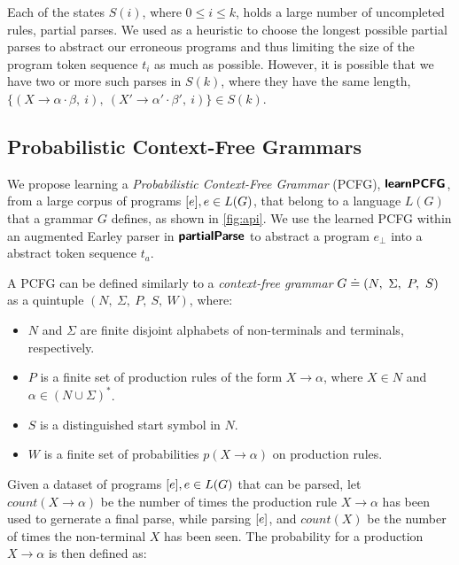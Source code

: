 Each of the states $S(i)$, where $0
\leq i \leq k$, holds a large number of uncompleted rules, \ie partial parses.
We used as a heuristic to choose the longest possible partial parses to abstract
our erroneous programs and thus limiting the size of the program token sequence
$t_i$ as much as possible. However, it is possible that we have two or more such
parses in $S(k)$, where they have the same length, \eg $\{(X \rightarrow \alpha
\cdot \beta,\ i),\ (X' \rightarrow \alpha' \cdot \beta',\ i)\} \in S(k)$.




\subsection{Probabilistic Context-Free Grammars}
\label{sec:prog-abstract:pcfg}
We propose learning a \emph{Probabilistic Context-Free Grammar} (PCFG),
$\bm{\mathsf{learnPCFG}}$, from a large corpus of programs $[e], e \in L(G)$, that
belong to a language $L(G)$ that a grammar $G$ defines, as shown in
\autoref{fig:api}. We use the learned PCFG within an augmented Earley parser in
$\bm{\mathsf{partialParse}}$ to abstract a program $e_{\bot}$ into a abstract token sequence
$t_a$.

A PCFG can be defined similarly to a \emph{context-free grammar} $G \doteq (N,\
\Sigma,\ P,\ S)$ as a quintuple $(N,\ \Sigma,\ P,\ S,\ W)$, where:
\begin{itemize}
    \item $N$ and $\Sigma$ are finite disjoint alphabets of non-terminals and
    terminals, respectively.
    \item $P$ is a finite set of production rules of the form $X \rightarrow
    \alpha$, where $X \in N$ and $\alpha \in (N \cup \Sigma)^{\ast}$.
    \item $S$ is a distinguished start symbol in $N$.
    \item $W$ is a finite set of probabilities $p(X \rightarrow \alpha)$ on
    production rules.
\end{itemize}

Given a dataset of programs $[e], e \in L(G)$ that can be parsed, let
$count(X \rightarrow \alpha)$ be the number of times the production rule $X
\rightarrow \alpha$ has been used to gernerate a final parse, while parsing
$[e]$, and $count(X)$ be the number of times the non-terminal $X$ has been
seen. The probability for a production $X \rightarrow \alpha$ is then defined
as:

